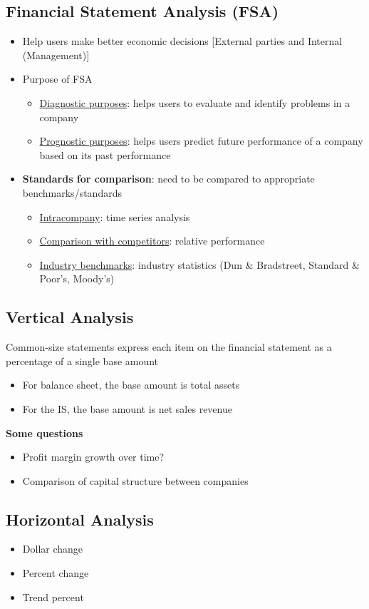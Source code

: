 \documentclass{article}
\begin{document}
\begin{multicols}{2}
\section{Financial Statement Analysis (FSA)}
\begin{itemize}
	\item Help users make better economic decisions [External parties and Internal (Management)]
	\item Purpose of FSA
	\begin{itemize}
		\item \underline{Diagnostic purposes}: helps users to evaluate and identify problems in a company
		\item \underline{Prognostic purposes}: helps users predict future performance of a company based on its past performance
	\end{itemize}
    \item \textbf{Standards for comparison}: need to be compared to appropriate benchmarks/standards
    \begin{itemize}
    	\item \underline{Intracompany}: time series analysis
    	\item \underline{Comparison with competitors}: relative performance
    	\item \underline{Industry benchmarks}: industry statistics (Dun \& Bradstreet, Standard \& Poor's, Moody's)
    \end{itemize}
\end{itemize}
\subsection{Vertical Analysis}
Common-size statements express each item on the financial statement as a percentage of a single base amount
\begin{itemize}
	\item For balance sheet, the base amount is total assets
	\item For the IS, the base amount is net sales revenue
\end{itemize}
\textbf{Some questions}
\begin{itemize}
	\item Profit margin growth over time?
	\item Comparison of capital structure between companies
\end{itemize}
\subsection{Horizontal Analysis}
\begin{itemize}
	\item Dollar change
	\item Percent change
	\item Trend percent
\end{itemize}


\end{multicols}
\end{document}
